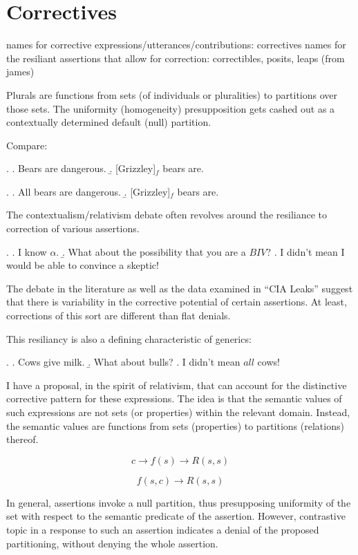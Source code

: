 \documentclass{article}
\begin{document}
  
\section{Correctives}

names for corrective expressions/utterances/contributions: correctives
names for the resiliant assertions that allow for correction: correctibles, posits, leaps (from james)


Plurals are functions from sets (of individuals or pluralities) to partitions over those sets.  The uniformity (homogeneity) presupposition gets cashed out as a contextually determined default (null) partition.  

Compare:

\ex. \a. Bears are dangerous.
\b. [Grizzley]$_f$ bears are.

\ex. \a. All bears are dangerous.
\b. [Grizzley]$_f$ bears are.

The contextualism/relativism debate often revolves around the resiliance to correction of various assertions.

\ex. \a. I know $\alpha$.
\b. What about the possibility that you are a $BIV$?
\a. I didn't mean I would be able to convince a skeptic!

The debate in the literature as well as the data examined in ``CIA Leaks'' suggest that there is variability in the corrective potential of certain assertions. At least, corrections of this sort are different than flat denials.

This resiliancy is also a defining characteristic of generics:

\ex. \a. Cows give milk.
\b. What about bulls?
\a. I didn't mean $all$ cows!

I have a proposal, in the spirit of relativism, that can account for the distinctive corrective pattern for these expressions. The idea is that the semantic values of such expressions are not sets (or properties) within the relevant domain.  Instead, the semantic values are functions from sets (properties) to partitions (relations) thereof.

\[c \rightarrow f(s) \rightarrow R(s,s)\]

\[f(s,c) \rightarrow R(s,s)\]

In general, assertions invoke a null partition, thus presupposing uniformity of the set with respect to the semantic predicate of the assertion.  However, contrastive topic in a response to such an assertion indicates a denial of the proposed partitioning, without denying the whole assertion.
\end{document}

